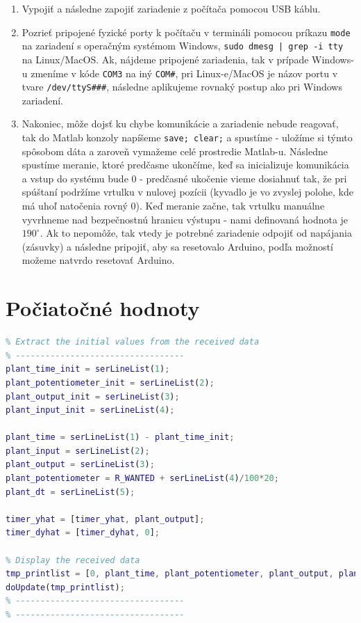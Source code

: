\documentclass[a4paper, 10pt, ]{article}
\begin{document}
\begin{enumerate}
    \item Vypojiť a následne zapojiť zariadenie z počítača pomocou USB káblu.
    \item Pozrieť pripojené fyzické porty k počítaču v termináli pomocou príkazu \texttt{mode} na zariadení s operačným systémom Windows, \texttt{sudo dmesg | grep -i tty} na Linux/MacOS. Ak, nájdeme pripojené zariadenia, tak v prípade Windows-u zmeníme v kóde \texttt{COM3} na iný \texttt{COM#}, pri Linux-e/MacOS je názov portu v tvare \texttt{/dev/ttyS###}, následne aplikujeme rovnaký postup ako pri Windows zariadení.
    \item Nakoniec, môže dojsť ku chybe komunikácie a zariadenie nebude reagovať, tak do Matlab konzoly napíšeme \texttt{save; clear;} a spustíme - uložíme si týmto spôsobom dáta a zaroveň vymažeme celé prostredie Matlab-u. Následne spustíme meranie, ktoré predčasne ukončíme, keď sa inicializuje komunikácia a vstup do systému bude $0$ - predčasné ukočenie vieme dosiahnuť tak, že pri spúštaní podržíme vrtulku v nulovej pozícii (kyvadlo je vo zvyslej polohe, kde má uhoľ natočenia rovný $0$). Keď meranie začne, tak vrtulku manuálne vyvrhneme nad bezpečnostnú hranicu výstupu - nami definovaná hodnota je $190^\circ$. Ak to nepomôže, tak vtedy je potrebné zariadenie odpojiť od napájania (zásuvky) a následne pripojiť, aby sa resetovalo Arduino, podľa možností možeme natvrdo resetovať Arduino.
\end{enumerate}

\section{Počiatočné hodnoty}
\begin{lstlisting}[caption=Zaznamenanie počiatočných hodnôt., label={code:init_values}, language=Matlab]
% ----------------------------------
% Extract the initial values from the received data
% ----------------------------------
plant_time_init = serLineList(1);
plant_potentiometer_init = serLineList(2);
plant_output_init = serLineList(3);
plant_input_init = serLineList(4);

plant_time = serLineList(1) - plant_time_init;
plant_input = serLineList(2);
plant_output = serLineList(3);
plant_potentiometer = R_WANTED + serLineList(4)/100*20;
plant_dt = serLineList(5);

timer_yhat = [timer_yhat, plant_output];
timer_dyhat = [timer_dyhat, 0];

% Display the received data
tmp_printlist = [0, plant_time, plant_potentiometer, plant_output, plant_input, plant_dt, T_sample];
doUpdate(tmp_printlist);
% ----------------------------------
% ----------------------------------
\end{lstlisting}
\end{document}
